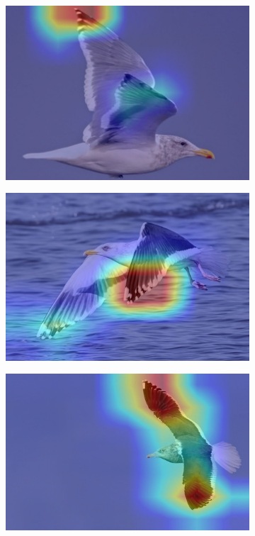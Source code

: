 \documentclass[a4paper,12pt]{report}
\begin{document}
\begin{figure}[htbp]
    \centering
    \begin{subfigure}[b]{0.22\textwidth}
        \includegraphics[width=\textwidth]{images/interpretability/vgg/bird1.jpg}
        \caption{}
    \end{subfigure}
    \hfill
    \begin{subfigure}[b]{0.22\textwidth}
        \includegraphics[width=\textwidth]{images/interpretability/vgg/bird10.jpeg}
        \caption{}
    \end{subfigure}
    \hfill
    \begin{subfigure}[b]{0.22\textwidth}
        \includegraphics[width=\textwidth]{images/interpretability/vgg/bird11.jpeg}

\end{subfigure}
\end{figure}
\end{document}
